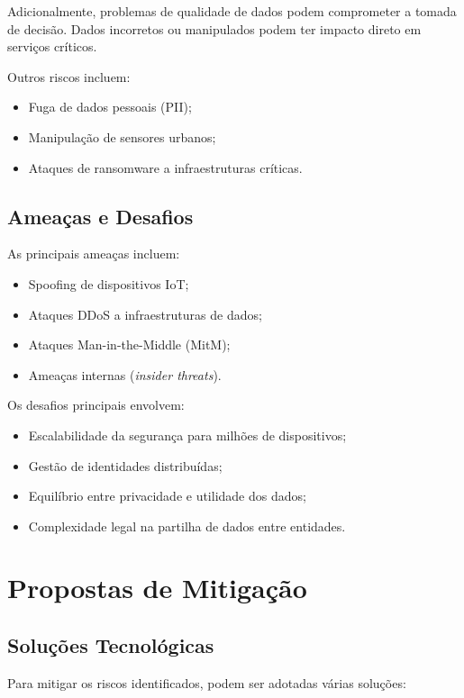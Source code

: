 \documentclass[a4paper]{article}
\begin{document}
Adicionalmente, problemas de qualidade de dados podem comprometer a tomada de decisão. Dados incorretos ou manipulados podem ter impacto direto em serviços críticos.

Outros riscos incluem:
\begin{itemize}
    \item Fuga de dados pessoais (PII);
    \item Manipulação de sensores urbanos;
    \item Ataques de ransomware a infraestruturas críticas.
\end{itemize}
\newpage
\subsection{Ameaças e Desafios}\label{ameaçasedesafios}
As principais ameaças incluem:
\begin{itemize}
    \item Spoofing de dispositivos IoT;
    \item Ataques DDoS a infraestruturas de dados;
    \item Ataques Man-in-the-Middle (MitM);
    \item Ameaças internas (\textit{insider threats}).
\end{itemize}

Os desafios principais envolvem:
\begin{itemize}
    \item Escalabilidade da segurança para milhões de dispositivos;
    \item Gestão de identidades distribuídas;
    \item Equilíbrio entre privacidade e utilidade dos dados;
    \item Complexidade legal na partilha de dados entre entidades.
\end{itemize}

\section{Propostas de Mitigação}\label{propostas}

\subsection{Soluções Tecnológicas}\label{solucoes}
Para mitigar os riscos identificados, podem ser adotadas várias soluções:
\end{document}
